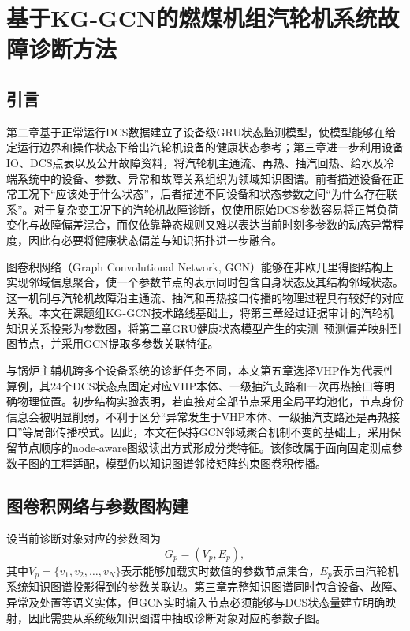 \section{基于KG-GCN的燃煤机组汽轮机系统故障诊断方法}
\label{sec:kg_gcn_v3}

\subsection{引言}

第二章基于正常运行DCS数据建立了设备级GRU状态监测模型，使模型能够在给定运行边界和操作状态下给出汽轮机设备的健康状态参考；第三章进一步利用设备IO、DCS点表以及公开故障资料，将汽轮机主通流、再热、抽汽回热、给水及冷端系统中的设备、参数、异常和故障关系组织为领域知识图谱。前者描述设备在正常工况下“应该处于什么状态”，后者描述不同设备和状态参数之间“为什么存在联系”。对于复杂变工况下的汽轮机故障诊断，仅使用原始DCS参数容易将正常负荷变化与故障偏差混合，而仅依靠静态规则又难以表达当前时刻多参数的动态异常程度，因此有必要将健康状态偏差与知识拓扑进一步融合。

图卷积网络（Graph Convolutional Network, GCN）能够在非欧几里得图结构上实现邻域信息聚合，使一个参数节点的表示同时包含自身状态及其结构邻域状态\cite{Kipf2017GCN}。这一机制与汽轮机故障沿主通流、抽汽和再热接口传播的物理过程具有较好的对应关系。本文在课题组KG-GCN技术路线\cite{YangHaodong2026CFB}基础上，将第三章经过证据审计的汽轮机知识关系投影为参数图，将第二章GRU健康状态模型产生的实测--预测偏差映射到图节点，并采用GCN提取多参数关联特征。

与锅炉主辅机跨多个设备系统的诊断任务不同，本文第五章选择VHP作为代表性算例，其24个DCS状态点固定对应VHP本体、一级抽汽支路和一次再热接口等明确物理位置。初步结构实验表明，若直接对全部节点采用全局平均池化，节点身份信息会被明显削弱，不利于区分“异常发生于VHP本体、一级抽汽支路还是再热接口”等局部传播模式。因此，本文在保持GCN邻域聚合机制不变的基础上，采用保留节点顺序的node-aware图级读出方式形成分类特征。该修改属于面向固定测点参数子图的工程适配，模型仍以知识图谱邻接矩阵约束图卷积传播。

\subsection{图卷积网络与参数图构建}
\label{subsec:gcn_v3}

设当前诊断对象对应的参数图为
\begin{equation}
    G_p=(V_p,E_p),
\end{equation}
其中$V_p=\{v_1,v_2,\ldots,v_N\}$表示能够加载实时数值的参数节点集合，$E_p$表示由汽轮机系统知识图谱投影得到的参数关联边。第三章完整知识图谱同时包含设备、故障、异常及处置等语义实体，但GCN实时输入节点必须能够与DCS状态量建立明确映射，因此需要从系统级知识图谱中抽取诊断对象对应的参数子图。

